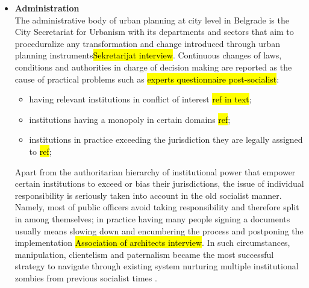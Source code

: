 \documentclass[11pt]{report}
\begin{document}
\begin{itemize}
\item \textbf{Administration}
\\
The administrative body of urban planning at city level in Belgrade is the City Secretariat for Urbanism with its departments and sectors that aim to proceduralize any transformation and change introduced through urban planning instruments\footnotemark \hl{Sekretarijat interview}.
Continuous changes of laws, conditions and authorities in charge of decision making are reported as the cause of practical problems such as \hl{experts questionnaire post-socialist}:
\begin{itemize}
\item having relevant institutions in conflict of interest \hl{ref in text}; 
\item institutions having a monopoly in certain domains \hl{ref};
\item institutions in practice exceeding the jurisdiction they are legally assigned to \hl{ref};
\end{itemize}

Apart from the authoritarian hierarchy of institutional power that empower certain institutions to exceed or bias their jurisdictions, the issue of individual responsibility is seriously taken into account in the old socialist manner. Namely, most of public officers avoid taking responsibility and therefore split in among themselves; in practice having many people signing a documents usually means slowing down and encumbering the process and postponing the implementation
\hl{Association of architects interview}. In such circumstances, manipulation, clientelism and paternalism became the most successful strategy to navigate through existing system nurturing multiple institutional zombies from previous socialist times \cite{Vujosevic 2012}. 


\end{itemize}
\end{document}
